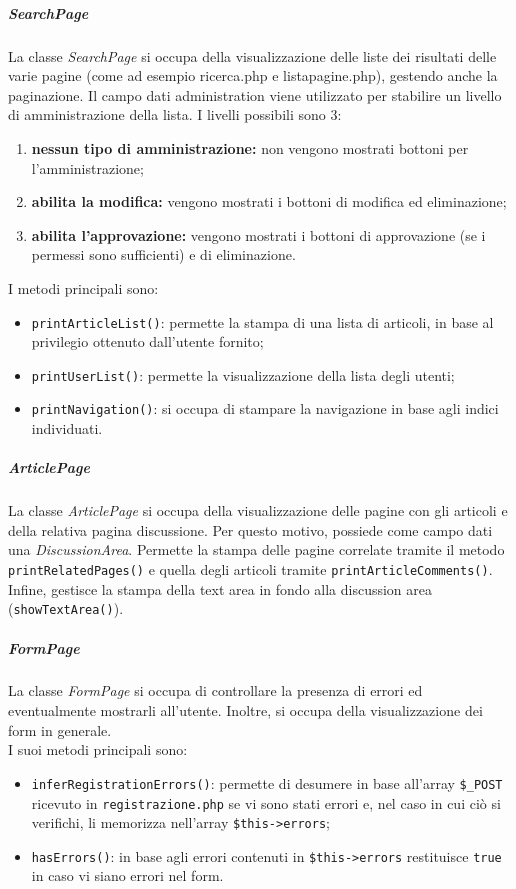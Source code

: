 \subparagraph{SearchPage}
La classe \textit{SearchPage} si occupa della visualizzazione delle liste dei risultati delle varie pagine (come ad esempio ricerca.php e listapagine.php), gestendo anche la paginazione. Il campo dati administration viene utilizzato per stabilire un livello di amministrazione della lista. I livelli possibili sono 3:
\begin{enumerate}[start=0, label=\textbf{\arabic*$\rightarrow$}]
	\item \textbf{nessun tipo di amministrazione:} non vengono mostrati bottoni per l'amministrazione;
	\item \textbf{abilita la modifica:} vengono mostrati i bottoni di modifica ed eliminazione;
	\item \textbf{abilita l'approvazione:} vengono mostrati i bottoni di approvazione (se i permessi sono sufficienti) e di eliminazione.
\end{enumerate}
I metodi principali sono:
\begin{itemize}
	\item \texttt{printArticleList()}: permette la stampa di una lista di articoli, in base al privilegio ottenuto dall'utente fornito;
	\item \texttt{printUserList()}: permette la visualizzazione della lista degli utenti;
	\item \texttt{printNavigation()}: si occupa di stampare la navigazione in base agli indici individuati.
\end{itemize}

\subparagraph{ArticlePage}
La classe \textit{ArticlePage} si occupa della visualizzazione delle pagine con gli articoli e della relativa pagina discussione. Per questo motivo, possiede come campo dati una \textit{DiscussionArea}. Permette la stampa delle pagine correlate tramite il metodo \texttt{printRelatedPages()} e quella degli articoli tramite \texttt{printArticleComments()}. Infine, gestisce la stampa della text area in fondo alla discussion area (\texttt{showTextArea()}).

\subparagraph{FormPage}
La classe \textit{FormPage} si occupa di controllare la presenza di errori ed eventualmente mostrarli all'utente. Inoltre, si occupa della visualizzazione dei form in generale.\\
I suoi metodi principali sono:
\begin{itemize}
	\item \texttt{inferRegistrationErrors()}: permette di desumere in base all'array \texttt{\$\_POST} ricevuto in \texttt{registrazione.php} se vi sono stati errori e, nel caso in cui ciò si verifichi, li memorizza nell'array \texttt{\$this->errors};
	\item \texttt{hasErrors()}: in base agli errori contenuti in \texttt{\$this->errors} restituisce \texttt{true} in caso vi siano errori nel form. 
\end{itemize}


